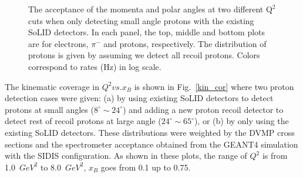 \begin{figure}[!ht]
 \begin{center}
   \caption[The acceptance of the momenta and scattering angles for electrons, $\pi^{-}$ and protons when only detecting small angle protons]{\footnotesize{The acceptance of the momenta and polar angles  at two different $\mathrm{Q^{2}}$ cuts  when only detecting small angle protons with the existing SoLID detectors. In each panel, the top, middle and bottom plots are for electrons, $\pi^{-}$ and protons, respectively. The distribution of protons is given by assuming we detect all recoil protons. Colors correspond to rates (Hz) in log scale.}}
  \label{p_theta1}
  \end{center}
\end{figure}
The kinematic coverage in $Q^{2} vs. x_{B}$ is shown in Fig.~\ref{kin_cor} where two proton detection cases were given: (a) by using  existing SoLID detectors to detect protons at small angles ($8^{\circ}\sim24^{\circ}$) and adding a new proton recoil detector to detect rest of recoil protons at large angle ($24^{\circ}\sim65^{\circ}$), or (b) by only using the existing SoLID detectors. These distributions were weighted by the DVMP cross sections and the spectrometer acceptance obtained from the GEANT4 simulation with the SIDIS configuration. As shown in these plots, the range of $Q^{2}$ is from 1.0~$GeV^{2}$ to 8.0~$GeV^{2}$, $x_{B}$ goes from 0.1 up to 0.75.   

